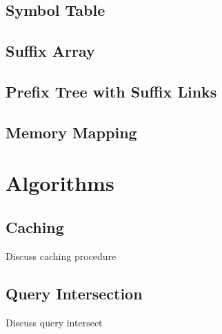 \documentclass{pbml}
\begin{document}
\subsection{Symbol Table}

\subsection{Suffix Array}

\subsection{Prefix Tree with Suffix Links}

\subsection{Memory Mapping}


\section{Algorithms}


\subsection{Caching}
Discuss caching procedure

\subsection{Query Intersection}
\label{query-intersection}
Discuss query intersect
\end{document}

